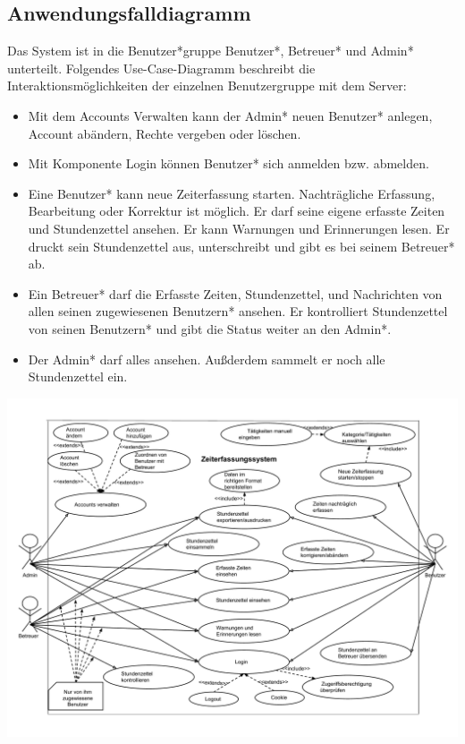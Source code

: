 \newpage
\subsection{Anwendungsfalldiagramm}
Das System ist in die Benutzer*gruppe Benutzer*, Betreuer* und Admin* unterteilt. Folgendes Use-Case-Diagramm beschreibt die Interaktionsmöglichkeiten der einzelnen Benutzergruppe mit dem Server:
\begin{itemize}
	\item Mit dem Accounts Verwalten kann der Admin* neuen Benutzer* anlegen, Account abändern, Rechte vergeben oder löschen.
	\item Mit Komponente Login können Benutzer* sich anmelden bzw. abmelden.
	\item Eine Benutzer* kann neue Zeiterfassung starten. Nachträgliche Erfassung, Bearbeitung oder Korrektur ist möglich. Er darf seine eigene erfasste Zeiten und Stundenzettel ansehen. Er kann Warnungen und Erinnerungen lesen. Er druckt sein Stundenzettel aus, unterschreibt und gibt es bei seinem Betreuer* ab.
	\item Ein Betreuer* darf die Erfasste Zeiten, Stundenzettel, und Nachrichten von allen seinen zugewiesenen Benutzern* ansehen. Er kontrolliert Stundenzettel von seinen Benutzern* und gibt die Status weiter an den Admin*.
	\item Der Admin* darf alles ansehen. Außderdem sammelt er noch alle Stundenzettel ein.
\end{itemize}


\includegraphics[width=\linewidth]{Anwendungsfalldiagramm.pdf}\\
